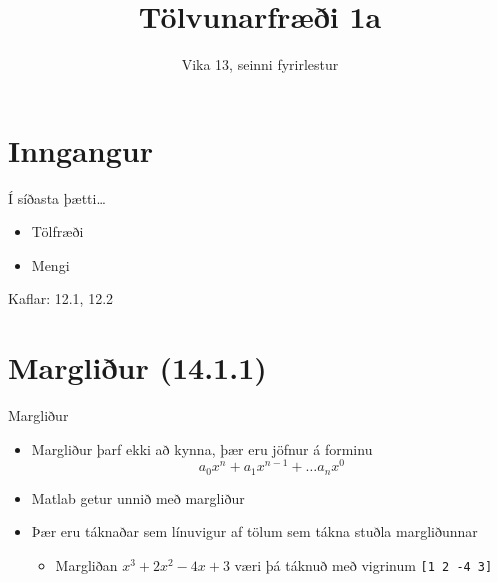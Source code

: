 \documentclass{beamer}
\title{Tölvunarfræði 1a}
\subtitle{Vika 13, seinni fyrirlestur}
\begin{document}
\begin{frame}
\titlepage
\end{frame}

\section{Inngangur}

\begin{frame}{Í síðasta þætti\ldots}
\begin{itemize}
 \item Tölfræði
 \item Mengi
\end{itemize}
Kaflar: 12.1, 12.2
\end{frame}

\section{Margliður (14.1.1)}

\begin{frame}[fragile]{Margliður}
\begin{itemize}
 \item Margliður þarf ekki að kynna, þær eru jöfnur á forminu
\[
 a_0x^n + a_1x^{n-1} + \ldots a_nx^0
\]
 \item Matlab getur unnið með margliður
 \item Þær eru táknaðar sem línuvigur af tölum sem tákna stuðla margliðunnar
 \begin{itemize}
  \item Margliðan $x^3 + 2x^2 -4x +3$ væri þá táknuð með vigrinum \verb|[1 2 -4 3]|
 \end{itemize} 
\end{itemize}
\end{frame}
\end{document}
